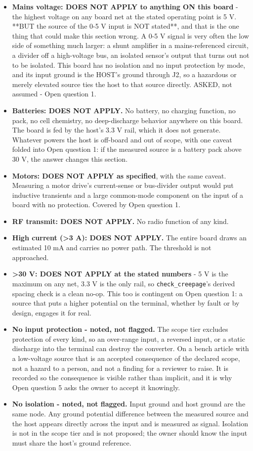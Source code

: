 \documentclass[11pt,a4paper]{article}
\begin{document}
\begin{itemize}
\item \textbf{Mains voltage: DOES NOT APPLY to anything ON this board} - the highest
voltage on any board net at the stated operating point is 5 V. {*}{*}BUT the
source of the 0-5 V input is NOT stated{*}{*}, and that is the one thing that
could make this section wrong. A 0-5 V signal is very often the low side of
something much larger: a shunt amplifier in a mains-referenced circuit, a
divider off a high-voltage bus, an isolated sensor's output that turns out
not to be isolated. This board has no isolation and no input protection by
mode, and its input ground is the HOST's ground through J2, so a hazardous
or merely elevated source ties the host to that source directly. ASKED, not
assumed - Open question 1.
\item \textbf{Batteries: DOES NOT APPLY.} No battery, no charging function, no pack, no
cell chemistry, no deep-discharge behavior anywhere on this board. The board
is fed by the host's 3.3 V rail, which it does not generate. Whatever powers
the host is off-board and out of scope, with one caveat folded into Open
question 1: if the measured source is a battery pack above 30 V, the answer
changes this section.
\item \textbf{Motors: DOES NOT APPLY as specified}, with the same caveat. Measuring a
motor drive's current-sense or bus-divider output would put inductive
transients and a large common-mode component on the input of a board with no
protection. Covered by Open question 1.
\item \textbf{RF transmit: DOES NOT APPLY.} No radio function of any kind.
\item \textbf{High current (\textgreater{}3 A): DOES NOT APPLY.} The entire board draws an estimated
10 mA and carries no power path. The threshold is not approached.
\item \textbf{\textgreater{}30 V: DOES NOT APPLY at the stated numbers} - 5 V is the maximum on any
net, 3.3 V is the only rail, so \texttt{check\_creepage}'s derived spacing check is a
clean no-op. This too is contingent on Open question 1: a source that puts a
higher potential on the terminal, whether by fault or by design, engages it
for real.
\item \textbf{No input protection - noted, not flagged.} The scope tier excludes
protection of every kind, so an over-range input, a reversed input, or a
static discharge into the terminal can destroy the converter. On a bench
article with a low-voltage source that is an accepted consequence of the
declared scope, not a hazard to a person, and not a finding for a reviewer to
raise. It is recorded so the consequence is visible rather than implicit, and
it is why Open question 5 asks the owner to accept it knowingly.
\item \textbf{No isolation - noted, not flagged.} Input ground and host ground are the
same node. Any ground potential difference between the measured source and
the host appears directly across the input and is measured as signal.
Isolation is not in the scope tier and is not proposed; the owner should know
the input must share the host's ground reference.
\end{itemize}
\end{document}
